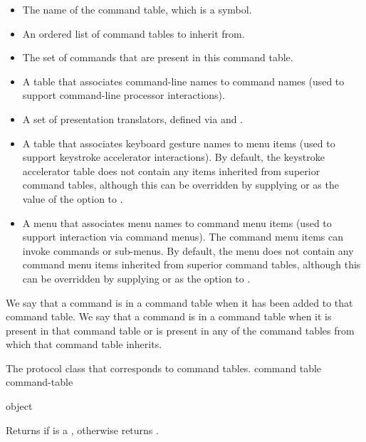 \begin{itemize}
\item The name of the command table, which is a symbol.

\item An ordered list of command tables to inherit from.

\item The set of commands that are present in this command table.

\item A table that associates command-line names to command names (used to
support command-line processor interactions).

\item A set of presentation translators, defined via
 and
.

\item A table that associates keyboard gesture names to menu items (used to
support keystroke accelerator interactions).  By default, the keystroke
accelerator table does not contain any items inherited from superior command
tables, although this can be overridden by supplying  or
 as the value of the  option to
.

\item A menu that associates menu names to command menu items (used to support
interaction via command menus).  The command menu items can invoke commands
or sub-menus.  By default, the menu does not contain any command menu items
inherited from superior command tables, although this can be overridden by
supplying  or  as the  option to
.
\end{itemize}

We say that a command is  in a command table when it has been
added to that command table.  We say that a command is  in a
command table when it is present in that command table or is present in any of
the command tables from which that command table inherits.



The protocol class that corresponds to command tables.
 {command table} {command-table}
\Mutable

 {object}

Returns  if  is a , otherwise returns
.

